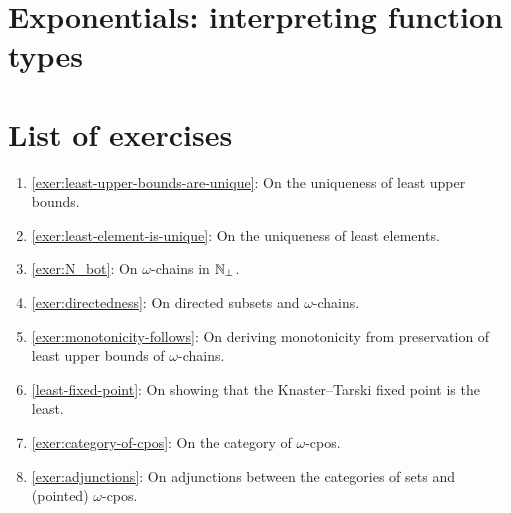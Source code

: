 \section{Exponentials: interpreting function types}


\section{List of exercises}
\begin{enumerate}
\item \cref{exer:least-upper-bounds-are-unique}: On the uniqueness of least upper bounds.
\item \cref{exer:least-element-is-unique}: On the uniqueness of least elements.
\item \cref{exer:N_bot}: On \(\omega\)-chains in \(\mathbb N_\bot\).
\item \cref{exer:directedness}: On directed subsets and \(\omega\)-chains.
\item \cref{exer:monotonicity-follows}: On deriving monotonicity from preservation of
  least upper bounds of \(\omega\)-chains.
\item \cref{least-fixed-point}: On showing that the Knaster--Tarski fixed point
  is the least.
\item \cref{exer:category-of-cpos}: On the category of \(\omega\)-cpos.
\item \cref{exer:adjunctions}: On adjunctions between the categories of sets and
  (pointed) \(\omega\)-cpos.
\end{enumerate}

